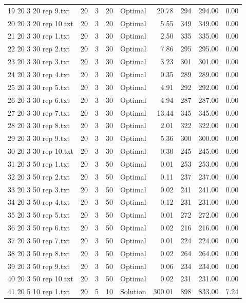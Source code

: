 \begin{longtable}{lrrllrrrr}
19 20 3 20 rep 9.txt & 20 & 3 & 20 & Optimal & 20.78 & 294 & 294.00 &  0.00\\
20 20 3 20 rep 10.txt & 20 & 3 & 20 & Optimal &  5.55 & 349 & 349.00 &  0.00\\
21 20 3 30 rep 1.txt & 20 & 3 & 30 & Optimal &  2.50 & 335 & 335.00 &  0.00\\
22 20 3 30 rep 2.txt & 20 & 3 & 30 & Optimal &  7.86 & 295 & 295.00 &  0.00\\
23 20 3 30 rep 3.txt & 20 & 3 & 30 & Optimal &  3.23 & 301 & 301.00 &  0.00\\
24 20 3 30 rep 4.txt & 20 & 3 & 30 & Optimal &  0.35 & 289 & 289.00 &  0.00\\
25 20 3 30 rep 5.txt & 20 & 3 & 30 & Optimal &  4.91 & 292 & 292.00 &  0.00\\
26 20 3 30 rep 6.txt & 20 & 3 & 30 & Optimal &  4.94 & 287 & 287.00 &  0.00\\
27 20 3 30 rep 7.txt & 20 & 3 & 30 & Optimal & 13.44 & 345 & 345.00 &  0.00\\
28 20 3 30 rep 8.txt & 20 & 3 & 30 & Optimal &  2.01 & 322 & 322.00 &  0.00\\
29 20 3 30 rep 9.txt & 20 & 3 & 30 & Optimal &  5.36 & 300 & 300.00 &  0.00\\
30 20 3 30 rep 10.txt & 20 & 3 & 30 & Optimal &  0.30 & 245 & 245.00 &  0.00\\
31 20 3 50 rep 1.txt & 20 & 3 & 50 & Optimal &  0.01 & 253 & 253.00 &  0.00\\
32 20 3 50 rep 2.txt & 20 & 3 & 50 & Optimal &  0.11 & 237 & 237.00 &  0.00\\
33 20 3 50 rep 3.txt & 20 & 3 & 50 & Optimal &  0.02 & 241 & 241.00 &  0.00\\
34 20 3 50 rep 4.txt & 20 & 3 & 50 & Optimal &  0.12 & 231 & 231.00 &  0.00\\
35 20 3 50 rep 5.txt & 20 & 3 & 50 & Optimal &  0.01 & 272 & 272.00 &  0.00\\
36 20 3 50 rep 6.txt & 20 & 3 & 50 & Optimal &  0.02 & 216 & 216.00 &  0.00\\
37 20 3 50 rep 7.txt & 20 & 3 & 50 & Optimal &  0.01 & 224 & 224.00 &  0.00\\
38 20 3 50 rep 8.txt & 20 & 3 & 50 & Optimal &  0.02 & 264 & 264.00 &  0.00\\
39 20 3 50 rep 9.txt & 20 & 3 & 50 & Optimal &  0.06 & 234 & 234.00 &  0.00\\
40 20 3 50 rep 10.txt & 20 & 3 & 50 & Optimal &  0.02 & 231 & 231.00 &  0.00\\
41 20 5 10 rep 1.txt & 20 & 5 & 10 & Solution & 300.01 & 898 & 833.00 &  7.24\\

\end{longtable}
